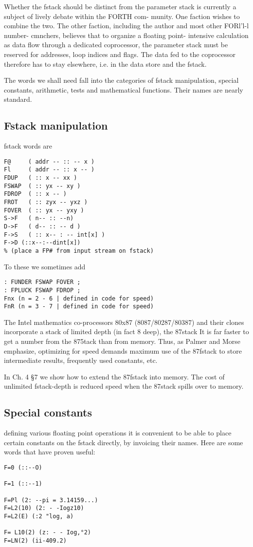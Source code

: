\leftbar[1\linewidth] 
Whether the fstack should be distinct from the parameter stack
is currently a subject of lively debate within the FORTH com-
munity. One faction wishes to combine the two. The other
faction, including the author and most other FORl'l-l number-
cmnchers, believes that to organize a floating point- intensive
calculation as data ﬂow through a dedicated coprocessor, the
parameter stack must be reserved for addresses, loop indices and
ﬂags. The data fed to the coprocessor therefore has to stay
elsewhere, i.e. in the data store and the fstack.
\endleftbar

The words we shall need fall into the categories of fstack 
manipulation, special constants, arithmetic, tests and mathematical functions.
Their names are nearly standard.

\subsection{Fstack manipulation}
 fstack words are
\begin{verbatim}
F@     ( addr -- :: -- x )
Fl     ( addr -- :: x -- )
FDUP   ( :: x -- xx )
FSWAP  ( :: yx -- xy )
FDROP  ( :: x -- )
FROT   ( :: zyx -- yxz )
FOVER  ( :: yx -- yxy )
S->F   ( n-- :: --n)
D->F   ( d-- :: -- d )
F->S   ( :: x-- : -- int[x] )
F->D (::x--:--dint[x])
% (place a FP# from input stream on fstack)
\end{verbatim}
 
To these we sometimes add

\begin{verbatim}
: FUNDER FSWAP FOVER ;
: FPLUCK FSWAP FDROP ;
Fnx (n = 2 - 6 | defined in code for speed)
FnR (n = 3 - 7 | defined in code for speed)
\end{verbatim}

The Intel mathematics co-processors 80x87 (8087/80287/80387)
and their clones incorporate a stack of limited depth (in fact 8
deep), the 87stack It is far faster to get a number from the 875tack
than from memory. Thus, as Palmer and Morse emphasize,
optimizing for speed demands maximum use of the 87fstack to store intermediate
results, frequently used constants, etc.

In Ch. 4 §7 we show how to extend the 87fstack into memory. The
cost of unlimited fstack-depth is reduced speed when the 87stack
spills over to memory.

\subsection{Special constants}
defining various floating point operations it is convenient to be
able to place certain constants on the fstack directly, by invoicing
their names. Here are some words that have proven useful:
\begin{verbatim}
F=0 (::--O)

F=1 (::--1)

F=Pl (2: --pi = 3.14159...)
F=L2(10) (2: - -Iogz10)
F=L2(E) (:2 "log, a)

F= L10(2) (z: - - Iog,°2)
F=LN(2) (ii-409.2)
\end{verbatim}
 
